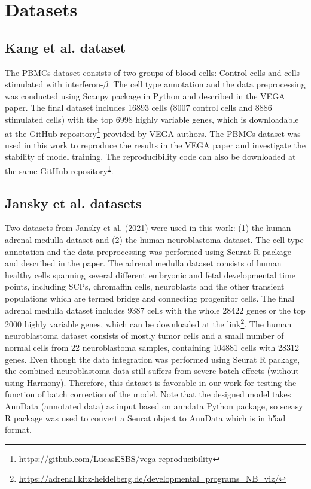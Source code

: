 \section{Datasets}\label{methods:data}
\subsection{Kang et al. dataset}
The PBMCs dataset\cite{Kang2018} consists of two groups of blood cells: Control cells and cells stimulated with interferon-$\beta$. The cell type annotation and the data preprocessing was conducted using Scanpy package\cite{Wolf2018} in Python and described in the VEGA paper\cite{Seninge2021}. The final dataset includes 16893 cells (8007 control cells and 8886 stimulated cells) with the top 6998 highly variable genes, which is downloadable at the GitHub repository\footnote{\label{footnote:reproducibility}\url{https://github.com/LucasESBS/vega-reproducibility}} provided by VEGA authors. The PBMCs dataset was used in this work to reproduce the results in the VEGA paper and investigate the stability of model training. The reproducibility code can also be downloaded at the same GitHub repository\textsuperscript{\ref{footnote:reproducibility}}.

\subsection{Jansky et al. datasets}
Two datasets from Jansky et al. (2021) were used in this work: (1) the human adrenal medulla dataset and (2) the human neuroblastoma dataset. The cell type annotation and the data preprocessing was performed using Seurat R package\cite{Stuart2019,Hao2021} and described in the paper\cite{Jansky2021}. The adrenal medulla dataset consists of human healthy cells spanning several different embryonic and fetal developmental time points, including SCPs, chromaffin cells, neuroblasts and the other transient populations which are termed bridge and connecting progenitor cells. The final adrenal medulla dataset includes 9387 cells with the whole 28422 genes or the top 2000 highly variable genes, which can be downloaded at the link\footnote{\url{https://adrenal.kitz-heidelberg.de/developmental_programs_NB_viz/}}. The human neuroblastoma dataset consists of mostly tumor cells and a small number of normal cells from 22 neuroblastoma samples, containing 104881 cells with 28312 genes. Even though the data integration was performed using Seurat R package, the combined neuroblastoma data still suffers from severe batch effects (without using Harmony\cite{Korsunsky2019}). Therefore, this dataset is favorable in our work for testing the function of batch correction of the model. Note that the designed model takes AnnData (annotated data) as input based on anndata Python package\cite{Virshup2021}, so sceasy R package\cite{Kiselev2020} was used to convert a Seurat object to AnnData which is in h5ad format.

